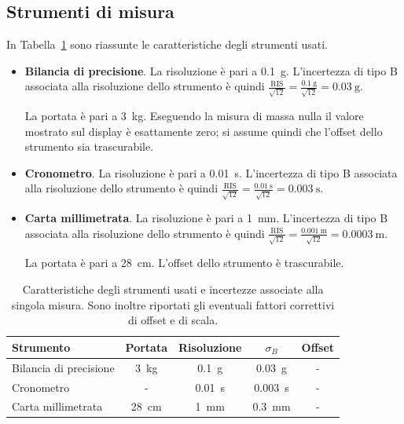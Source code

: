 \documentclass[titlepage]{article}
\numberwithin{equation}{section}
\numberwithin{figure}{section}
\numberwithin{table}{section}
\begin{document}
\subsection{Strumenti di misura}

In Tabella~\ref{tab:strumenti} sono riassunte le caratteristiche degli strumenti usati.

\begin{itemize}
  \item \textbf{Bilancia di precisione}.
    La risoluzione è pari a \SI{0.1}{\gram}.
    L'incertezza di tipo B associata alla risoluzione dello strumento è quindi
    $\frac{\text{RIS}}{\sqrt{12}} = \frac{\SI{0.1}{\gram}}{\sqrt{12}} = \SI{0.03}{\gram}$.

    La portata è pari a \SI{3}{\kilogram}.
    Eseguendo la misura di massa nulla il valore mostrato sul display è esattamente zero; si assume quindi che l'offset dello strumento sia trascurabile.

  \item \textbf{Cronometro}.
    La risoluzione è pari a \SI{0.01}{\second}.
    L'incertezza di tipo B associata alla risoluzione dello strumento è quindi
    $\frac{\text{RIS}}{\sqrt{12}} = \frac{\SI{0.01}{\second}}{\sqrt{12}} = \SI{0.003}{\second}$.

  \item \textbf{Carta millimetrata}.
    La risoluzione è pari a \SI{1}{\milli\metre}.
    L'incertezza di tipo B associata alla risoluzione dello strumento è quindi
    $\frac{\text{RIS}}{\sqrt{12}} = \frac{\SI{0.001}{\metre}}{\sqrt{12}} = \SI{0.0003}{\metre}$.

    La portata è pari a \SI{28}{\centi\metre}. L'offset dello strumento è trascurabile.
\end{itemize}

\begin{table}[ht]
  \centering
  \begin{tabular}{lcccc}
    \toprule
    Strumento & Portata & Risoluzione & $\sigma_B$ & Offset \\
    \midrule
    Bilancia di precisione & \SI{3}{\kilogram} & \SI{0.1}{\gram} & \SI{0.03}{\gram} & - \\
    Cronometro & - & \SI{0.01}{\second} & \SI{0.003}{\second} & - \\
    Carta millimetrata & \SI{28}{\centi\metre} & \SI{1}{\milli\metre} & \SI{0.3}{\milli\metre} & - \\
    \bottomrule
  \end{tabular}
  \caption{Caratteristiche degli strumenti usati e incertezze associate alla singola misura. Sono inoltre riportati gli eventuali fattori correttivi di offset e di scala.}
  \label{tab:strumenti}
\end{table}
\end{document}
